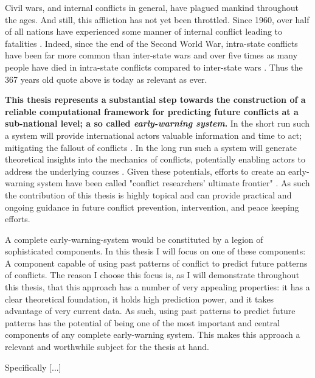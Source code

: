 \documentclass[a4paper]{article}
\begin{document}
Civil wars, and internal conflicts in general, have plagued mankind throughout the ages. And still, this affliction has not yet been throttled. Since 1960, over half of all nations have experienced some manner of internal conflict leading to fatalities \citep[3-4]{Blattman_Miguel_2010}. Indeed, since the end of the Second World War, intra-state conflicts have been far more common than inter-state wars and over five times as many people have died in intra-state conflicts compared to inter-state wars \citep[563]{Collier_Hoeffler_2004}. Thus the 367 years old quote above is today as relevant as ever.\par

\textbf{This thesis represents a substantial step towards the construction of a reliable computational framework for predicting future conflicts at a sub-national level; a so called \emph{early-warning system}.} In the short run such a system will provide international actors valuable information and time to act; mitigating the fallout of conflicts \citep{Ward_Greenhill_Bakke_2010, perry_2013}. In the long run such a system will generate theoretical insights into the mechanics of conflicts, potentially enabling actors to address the underlying courses \citep{Schrodt_2014, chadefaux2017conflict}. Given these potentials, efforts to create an early-warning system have been called "conflict researchers’ ultimate frontier" \citep[474]{cederman2017predicting}. As such the contribution of this thesis is highly topical and can provide practical and ongoing guidance in future conflict prevention, intervention, and peace keeping efforts.\par

A complete early-warning-system would be constituted by a legion of sophisticated components. In this thesis I will focus on one of these components: A component capable of using past patterns of conflict to predict future patterns of conflicts. The reason I choose this focus is, as I will demonstrate throughout this thesis, that this approach has a number of very appealing properties: it has a clear theoretical foundation, it holds high prediction power, and it takes advantage of very current data. As such, using past patterns to predict future patterns has the potential of being one of the most important and central components of any complete early-warning system. This makes this approach a relevant and worthwhile subject for the thesis at hand.\par

Specifically [...]
\end{document}
